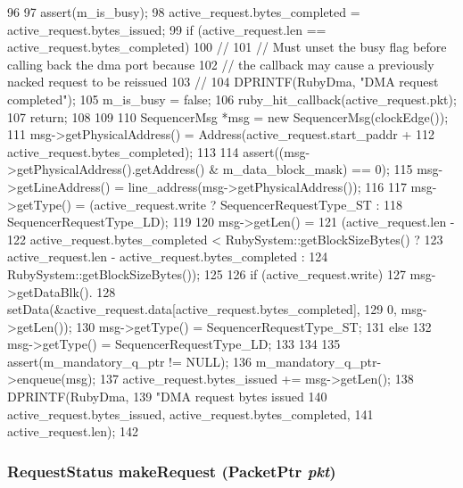 \begin{DoxyCode}
96 {
97     assert(m_is_busy);
98     active_request.bytes_completed = active_request.bytes_issued;
99     if (active_request.len == active_request.bytes_completed) {
100         //
101         // Must unset the busy flag before calling back the dma port because
102         // the callback may cause a previously nacked request to be reissued
103         //
104         DPRINTF(RubyDma, "DMA request completed\n");
105         m_is_busy = false;
106         ruby_hit_callback(active_request.pkt);
107         return;
108     }
109 
110     SequencerMsg *msg = new SequencerMsg(clockEdge());
111     msg->getPhysicalAddress() = Address(active_request.start_paddr +
112                                        active_request.bytes_completed);
113 
114     assert((msg->getPhysicalAddress().getAddress() & m_data_block_mask) == 0);
115     msg->getLineAddress() = line_address(msg->getPhysicalAddress());
116 
117     msg->getType() = (active_request.write ? SequencerRequestType_ST :
118                      SequencerRequestType_LD);
119 
120     msg->getLen() =
121         (active_request.len -
122          active_request.bytes_completed < RubySystem::getBlockSizeBytes() ?
123          active_request.len - active_request.bytes_completed :
124          RubySystem::getBlockSizeBytes());
125 
126     if (active_request.write) {
127         msg->getDataBlk().
128             setData(&active_request.data[active_request.bytes_completed],
129                     0, msg->getLen());
130         msg->getType() = SequencerRequestType_ST;
131     } else {
132         msg->getType() = SequencerRequestType_LD;
133     }
134 
135     assert(m_mandatory_q_ptr != NULL);
136     m_mandatory_q_ptr->enqueue(msg);
137     active_request.bytes_issued += msg->getLen();
138     DPRINTF(RubyDma, 
139             "DMA request bytes issued %
140             active_request.bytes_issued, active_request.bytes_completed,
141             active_request.len);
142 }
\end{DoxyCode}
\hypertarget{classDMASequencer_a23de6e3fbb2362f4410d435e3600d0f7}{
\subsubsection[{makeRequest}]{\setlength{\rightskip}{0pt plus 5cm}RequestStatus makeRequest ({\bf PacketPtr} {\em pkt})}}
\label{classDMASequencer_a23de6e3fbb2362f4410d435e3600d0f7}



